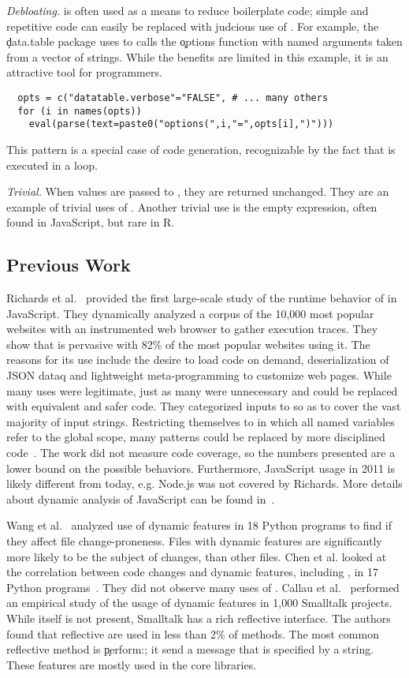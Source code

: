 \documentclass[USenglish,cleveref, autoref, thm-restate]{lipics-v2019}
\newcommand{\mypara}[1]{\medskip\noindent\emph{#1}\xspace}
\begin{document}
\mypara{Debloating.} \Eval is often used as a means to reduce
boilerplate code; simple and repetitive code can easily be replaced
with judcious use of \eval. For example, the \c{data.table} package
uses \eval to calls the \c{options} function with named arguments
taken from a vector of strings. While the benefits are limited in this
example, it is an attractive tool for programmers.
\begin{lstlisting}
  opts = c("datatable.verbose"="FALSE", # ... many others
  for (i in names(opts))
    eval(parse(text=paste0("options(",i,"=",opts[i],")")))
\end{lstlisting}
This pattern is a special case of code generation, recognizable by the
fact that \eval is executed in a loop.

\mypara{Trivial.} When values are passed to \eval, they are returned
unchanged. They are an example of trivial uses of \eval. Another
trivial use is the empty expression, often found in JavaScript, but
rare in R.


\subsection{Previous Work}

Richards et al.~\cite{ecoop11} provided the first large-scale study of
the runtime behavior of \eval in JavaScript. They dynamically analyzed
a corpus of the 10,000 most popular websites with an instrumented web
browser to gather execution traces. They show that \eval is pervasive
with 82\% of the most popular websites using it. The reasons for its
use include the desire to load code on demand, deserialization of JSON
dataq and lightweight meta-programming to customize web pages. While
many uses were legitimate, just as many were unnecessary and could be
replaced with equivalent and safer code. They categorized inputs to
\eval so as to cover the vast majority of input strings. Restricting
themselves to \eval in which all named variables refer to the global
scope, many patterns could be replaced by more disciplined
code~\cite{oopsla12b, moller12}. The work did not measure code
coverage, so the numbers presented are a lower bound on the possible
behaviors. Furthermore, JavaScript usage in 2011 is likely different
from today, e.g. Node.js was not covered by Richards. More details
about dynamic analysis of JavaScript can be found in~\cite{liang}.

Wang et al.~\cite{wang} analyzed use of dynamic features in 18 Python
programs to find if they affect file change-proneness. Files with
dynamic features are significantly more likely to be the subject of
changes, than other files. Chen et al. looked at the correlation
between code changes and dynamic features, including \eval, in 17
Python programs~\cite{chen}. They did not observe many uses of \eval.
Callau et al.~\cite{oscar} performed an empirical study of the usage
of dynamic features in 1,000 Smalltalk projects. While \eval itself is
not present, Smalltalk has a rich reflective interface. The authors
found that reflective are used in less than 2\% of methods. The most
common reflective method is \c{perform:}; it send a message that is
specified by a string. These features are mostly used in the core
libraries.
\end{document}

